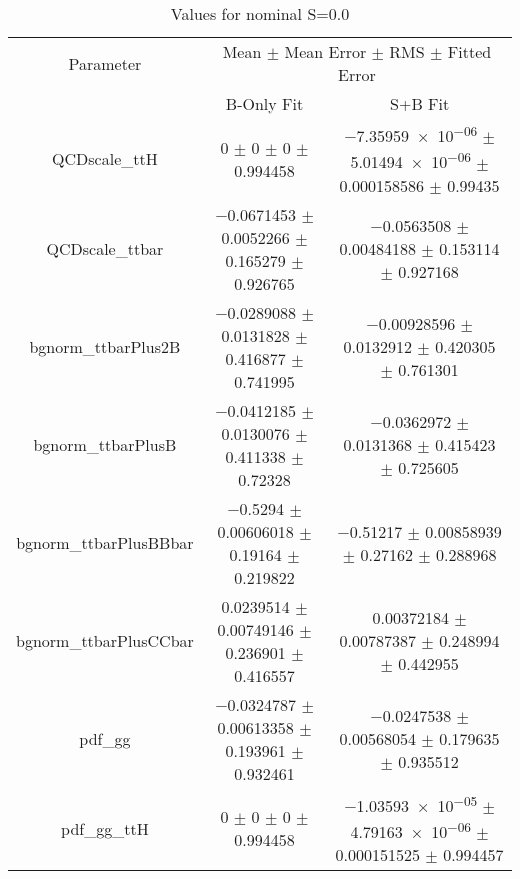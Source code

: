 \begin{table}
\centering
\caption{Values for nominal S=0.0}
\begin{tabular}{ccc}
\toprule
Parameter & \multicolumn{2}{c}{Mean $\pm$ Mean Error $\pm$ RMS $\pm$ Fitted Error}\\
 & B-Only Fit & S+B Fit\\
\midrule
QCDscale\_ttH & \num{0} $\pm$ \num{0} $\pm$ \num{0} $\pm$ \num{0.994458} & \num{-7.35959e-06} $\pm$ \num{5.01494e-06} $\pm$ \num{0.000158586} $\pm$ \num{0.99435}\\
QCDscale\_ttbar & \num{-0.0671453} $\pm$ \num{0.0052266} $\pm$ \num{0.165279} $\pm$ \num{0.926765} & \num{-0.0563508} $\pm$ \num{0.00484188} $\pm$ \num{0.153114} $\pm$ \num{0.927168}\\
bgnorm\_ttbarPlus2B & \num{-0.0289088} $\pm$ \num{0.0131828} $\pm$ \num{0.416877} $\pm$ \num{0.741995} & \num{-0.00928596} $\pm$ \num{0.0132912} $\pm$ \num{0.420305} $\pm$ \num{0.761301}\\
bgnorm\_ttbarPlusB & \num{-0.0412185} $\pm$ \num{0.0130076} $\pm$ \num{0.411338} $\pm$ \num{0.72328} & \num{-0.0362972} $\pm$ \num{0.0131368} $\pm$ \num{0.415423} $\pm$ \num{0.725605}\\
bgnorm\_ttbarPlusBBbar & \num{-0.5294} $\pm$ \num{0.00606018} $\pm$ \num{0.19164} $\pm$ \num{0.219822} & \num{-0.51217} $\pm$ \num{0.00858939} $\pm$ \num{0.27162} $\pm$ \num{0.288968}\\
bgnorm\_ttbarPlusCCbar & \num{0.0239514} $\pm$ \num{0.00749146} $\pm$ \num{0.236901} $\pm$ \num{0.416557} & \num{0.00372184} $\pm$ \num{0.00787387} $\pm$ \num{0.248994} $\pm$ \num{0.442955}\\
pdf\_gg & \num{-0.0324787} $\pm$ \num{0.00613358} $\pm$ \num{0.193961} $\pm$ \num{0.932461} & \num{-0.0247538} $\pm$ \num{0.00568054} $\pm$ \num{0.179635} $\pm$ \num{0.935512}\\
pdf\_gg\_ttH & \num{0} $\pm$ \num{0} $\pm$ \num{0} $\pm$ \num{0.994458} & \num{-1.03593e-05} $\pm$ \num{4.79163e-06} $\pm$ \num{0.000151525} $\pm$ \num{0.994457}\\
\bottomrule
\end{tabular}
\end{table}